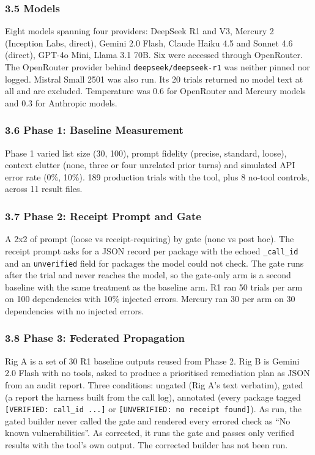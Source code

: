 \documentclass[
]{article}
\newcounter{none} %
\begin{document}
\subsubsection{3.5 Models}\label{models}

Eight models spanning four providers: DeepSeek R1 and V3, Mercury 2
(Inception Labs, direct), Gemini 2.0 Flash, Claude Haiku 4.5 and Sonnet
4.6 (direct), GPT-4o Mini, Llama 3.1 70B. Six were accessed through
OpenRouter. The OpenRouter provider behind \texttt{deepseek/deepseek-r1}
was neither pinned nor logged. Mistral Small 2501 was also run. Its 20
trials returned no model text at all and are excluded. Temperature was
0.6 for OpenRouter and Mercury models and 0.3 for Anthropic models.

\subsubsection{3.6 Phase 1: Baseline
Measurement}\label{phase-1-baseline-measurement}

Phase 1 varied list size (30, 100), prompt fidelity (precise, standard,
loose), context clutter (none, three or four unrelated prior turns) and
simulated API error rate (0\%, 10\%). 189 production trials with the
tool, plus 8 no-tool controls, across 11 result files.

\subsubsection{3.7 Phase 2: Receipt Prompt and
Gate}\label{phase-2-receipt-prompt-and-gate}

A 2x2 of prompt (loose vs receipt-requiring) by gate (none vs post hoc).
The receipt prompt asks for a JSON record per package with the echoed
\texttt{\_call\_id} and an \texttt{unverified} field for packages the
model could not check. The gate runs after the trial and never reaches
the model, so the gate-only arm is a second baseline with the same
treatment as the baseline arm. R1 ran 50 trials per arm on 100
dependencies with 10\% injected errors. Mercury ran 30 per arm on 30
dependencies with no injected errors.

\subsubsection{3.8 Phase 3: Federated
Propagation}\label{phase-3-federated-propagation}

Rig A is a set of 30 R1 baseline outputs reused from Phase 2. Rig B is
Gemini 2.0 Flash with no tools, asked to produce a prioritised
remediation plan as JSON from an audit report. Three conditions: ungated
(Rig A's text verbatim), gated (a report the harness built from the call
log), annotated (every package tagged
\texttt{{[}VERIFIED:\ call\_id\ ...{]}} or
\texttt{{[}UNVERIFIED:\ no\ receipt\ found{]}}). As run, the gated
builder never called the gate and rendered every errored check as ``No
known vulnerabilities''. As corrected, it runs the gate and passes only
verified results with the tool's own output. The corrected builder has
not been run.
\end{document}
